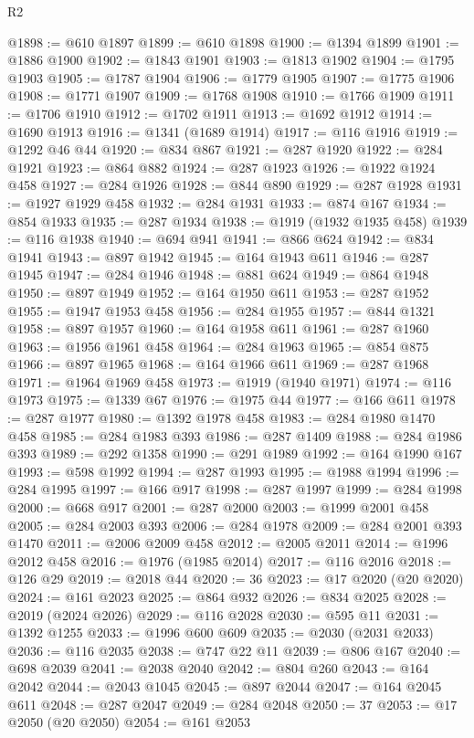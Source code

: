 \begin{lexlean}{R2}
\begin{coremodule}
@1898 := @610 @1897
@1899 := @610 @1898
@1900 := @1394 @1899
@1901 := @1886 @1900
@1902 := @1843 @1901
@1903 := @1813 @1902
@1904 := @1795 @1903
@1905 := @1787 @1904
@1906 := @1779 @1905
@1907 := @1775 @1906
@1908 := @1771 @1907
@1909 := @1768 @1908
@1910 := @1766 @1909
@1911 := @1706 @1910
@1912 := @1702 @1911
@1913 := @1692 @1912
@1914 := @1690 @1913
@1916 := @1341 (@1689 @1914)
@1917 := @116 @1916
@1919 := @1292 @46 @44
@1920 := @834 @867
@1921 := @287 @1920
@1922 := @284 @1921
@1923 := @864 @882
@1924 := @287 @1923
@1926 := @1922 @1924 @458
@1927 := @284 @1926
@1928 := @844 @890
@1929 := @287 @1928
@1931 := @1927 @1929 @458
@1932 := @284 @1931
@1933 := @874 @167
@1934 := @854 @1933
@1935 := @287 @1934
@1938 := @1919 (@1932 @1935 @458)
@1939 := @116 @1938
@1940 := @694 @941
@1941 := @866 @624
@1942 := @834 @1941
@1943 := @897 @1942
@1945 := @164 @1943 @611
@1946 := @287 @1945
@1947 := @284 @1946
@1948 := @881 @624
@1949 := @864 @1948
@1950 := @897 @1949
@1952 := @164 @1950 @611
@1953 := @287 @1952
@1955 := @1947 @1953 @458
@1956 := @284 @1955
@1957 := @844 @1321
@1958 := @897 @1957
@1960 := @164 @1958 @611
@1961 := @287 @1960
@1963 := @1956 @1961 @458
@1964 := @284 @1963
@1965 := @854 @875
@1966 := @897 @1965
@1968 := @164 @1966 @611
@1969 := @287 @1968
@1971 := @1964 @1969 @458
@1973 := @1919 (@1940 @1971)
@1974 := @116 @1973
@1975 := @1339 @67
@1976 := @1975 @44
@1977 := @166 @611
@1978 := @287 @1977
@1980 := @1392 @1978 @458
@1983 := @284 @1980 @1470 @458
@1985 := @284 @1983 @393
@1986 := @287 @1409
@1988 := @284 @1986 @393
@1989 := @292 @1358
@1990 := @291 @1989
@1992 := @164 @1990 @167
@1993 := @598 @1992
@1994 := @287 @1993
@1995 := @1988 @1994
@1996 := @284 @1995
@1997 := @166 @917
@1998 := @287 @1997
@1999 := @284 @1998
@2000 := @668 @917
@2001 := @287 @2000
@2003 := @1999 @2001 @458
@2005 := @284 @2003 @393
@2006 := @284 @1978
@2009 := @284 @2001 @393 @1470
@2011 := @2006 @2009 @458
@2012 := @2005 @2011
@2014 := @1996 @2012 @458
@2016 := @1976 (@1985 @2014)
@2017 := @116 @2016
@2018 := @126 @29
@2019 := @2018 @44
@2020 := 36
@2023 := @17 @2020 (@20 @2020)
@2024 := @161 @2023
@2025 := @864 @932
@2026 := @834 @2025
@2028 := @2019 (@2024 @2026)
@2029 := @116 @2028
@2030 := @595 @11
@2031 := @1392 @1255
@2033 := @1996 @600 @609
@2035 := @2030 (@2031 @2033)
@2036 := @116 @2035
@2038 := @747 @22 @11
@2039 := @806 @167
@2040 := @698 @2039
@2041 := @2038 @2040
@2042 := @804 @260
@2043 := @164 @2042
@2044 := @2043 @1045
@2045 := @897 @2044
@2047 := @164 @2045 @611
@2048 := @287 @2047
@2049 := @284 @2048
@2050 := 37
@2053 := @17 @2050 (@20 @2050)
@2054 := @161 @2053

\end{coremodule}
\end{lexlean}
